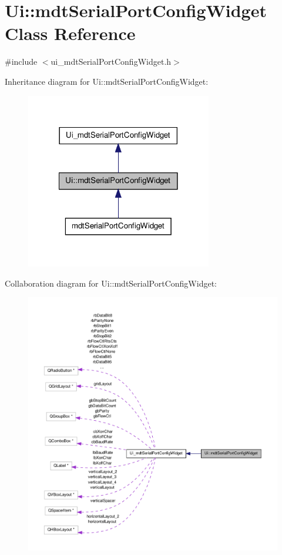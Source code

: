 \hypertarget{class_ui_1_1mdt_serial_port_config_widget}{\section{Ui\-:\-:mdt\-Serial\-Port\-Config\-Widget Class Reference}
\label{class_ui_1_1mdt_serial_port_config_widget}
}


{\ttfamily \#include $<$ui\-\_\-mdt\-Serial\-Port\-Config\-Widget.\-h$>$}



Inheritance diagram for Ui\-:\-:mdt\-Serial\-Port\-Config\-Widget\-:\nopagebreak
\begin{figure}[H]
\begin{center}
\leavevmode
\includegraphics[width=230pt]{class_ui_1_1mdt_serial_port_config_widget__inherit__graph}
\end{center}
\end{figure}


Collaboration diagram for Ui\-:\-:mdt\-Serial\-Port\-Config\-Widget\-:\nopagebreak
\begin{figure}[H]
\begin{center}
\leavevmode
\includegraphics[width=350pt]{class_ui_1_1mdt_serial_port_config_widget__coll__graph}
\end{center}
\end{figure}
